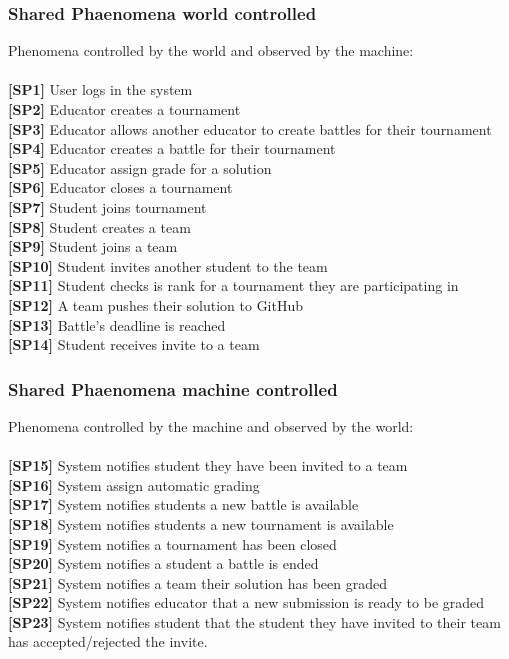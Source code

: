 \documentclass{article}
\begin{document}
\subsubsection{Shared Phaenomena world controlled}
Phenomena controlled by the world and observed by the machine:\\\\
\textbf{[SP1]} User logs in the system\\
\textbf{[SP2]} Educator creates a tournament\\
\textbf{[SP3]} Educator allows another educator to create battles for their tournament\\
\textbf{[SP4]} Educator creates a battle for their tournament\\
\textbf{[SP5]} Educator assign grade for a solution\\
\textbf{[SP6]} Educator closes a tournament\\
\textbf{[SP7]} Student joins tournament\\
\textbf{[SP8]} Student creates a team\\
\textbf{[SP9]} Student joins a team\\
\textbf{[SP10]} Student invites another student to the team\\
\textbf{[SP11]} Student checks is rank for a tournament they are participating in\\
\textbf{[SP12]} A team pushes their solution to GitHub\\
\textbf{[SP13]} Battle’s deadline is reached\\
\textbf{[SP14]} Student receives invite to a team\\
\subsubsection{Shared Phaenomena machine controlled}
Phenomena controlled by the machine and observed by the world:\\\\
\textbf{[SP15]} System notifies student they have been invited to a team\\
\textbf{[SP16]} System assign automatic grading\\
\textbf{[SP17]} System notifies students a new battle is available\\
\textbf{[SP18]} System notifies students a new tournament is available\\ 
\textbf{[SP19]} System notifies a tournament has been closed\\
\textbf{[SP20]} System notifies a student a battle is ended\\
\textbf{[SP21]} System notifies a team their solution has been graded\\
\textbf{[SP22]} System notifies educator that a new submission is ready to be graded\\
\textbf{[SP23]} System notifies student that the student they have invited to their team has accepted/rejected the invite.\\
\end{document}
